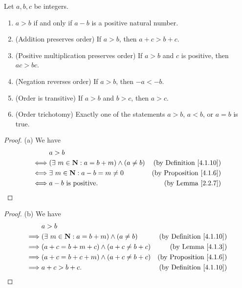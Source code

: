 \begin{lemma}\label{4.1.11}
    Let \(a, b, c\) be integers.
    \begin{enumerate}
        \item \(a > b\) if and only if \(a - b\) is a positive natural number.
        \item (Addition preserves order) If \(a > b\), then \(a + c > b + c\).
        \item (Positive multiplication preserves order) If \(a > b\) and \(c\) is positive, then \(ac > bc\).
        \item (Negation reverses order) If \(a > b\), then \(-a < -b\).
        \item (Order is transitive) If \(a > b\) and \(b > c\), then \(a > c\).
        \item (Order trichotomy) Exactly one of the statements \(a > b\), \(a < b\), or \(a = b\) is true.
    \end{enumerate}
\end{lemma}

\begin{proof}{(a)}
    We have
    \begin{align*}
             & a > b                                                                                          \\
        \iff & (\exists\ m \in \mathbf{N} : a = b + m) \land (a \neq b) & \text{(by Definition \ref{4.1.10})} \\
        \iff & \exists\ m \in \mathbf{N} : a - b = m \neq 0             & \text{(by Proposition \ref{4.1.6})} \\
        \iff & a - b \text{ is positive}.                               & \text{(by Lemma \ref{2.2.7})}
    \end{align*}
\end{proof}

\begin{proof}{(b)}
    We have
    \begin{align*}
                 & a > b                                                                                          \\
        \implies & (\exists\ m \in \mathbf{N} : a = b + m) \land (a \neq b) & \text{(by Definition \ref{4.1.10})} \\
        \implies & (a + c = b + m + c) \land (a + c \neq b + c)             & \text{(by Lemma \ref{4.1.3})}       \\
        \implies & (a + c = b + c + m) \land (a + c \neq b + c)             & \text{(by Proposition \ref{4.1.6})} \\
        \implies & a + c > b + c.                                           & \text{(by Definition \ref{4.1.10})}
    \end{align*}
\end{proof}


